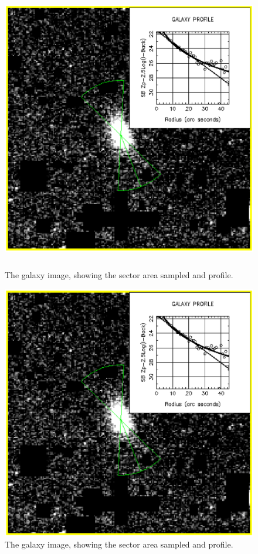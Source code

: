 \documentclass[twoside,11pt]{article}
\newenvironment{latexonly}{}{}
\begin{document}
\begin{latexonly}
\begin{figure}[htlb]
\centering 
\includegraphics[height=125mm,width=125mm]{sun180_diag4.eps}
\caption{The galaxy image, showing the sector area sampled and profile.}
\end{figure}
\end{latexonly}
\begin{htmlonly}
\begin{figure}[htlb]
\centering 
\includegraphics{sun180_diag4.eps}
\caption{The galaxy image, showing the sector area sampled and profile.}
\end{figure}
\end{htmlonly}
\end{document}
